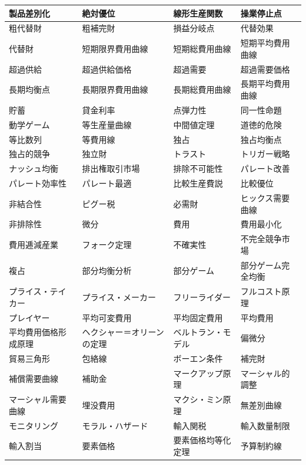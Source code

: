 \documentclass[xelatex,a4paper,base=11pt,ja=standard,jafont=noto]{bxjsreport}
\begin{document}
\begin{table}[H]
\centering
\small
\begin{tabular}{|>{\raggedright\arraybackslash}p{3.5cm}|>{\raggedright\arraybackslash}p{3.5cm}|>{\raggedright\arraybackslash}p{3.5cm}|>{\raggedright\arraybackslash}p{3.5cm}|}
\hline
製品差別化 & 絶対優位 & 線形生産関数 & 操業停止点 \\
\hline
粗代替財 & 粗補完財 & 損益分岐点 & 代替効果 \\
\hline
代替財 & 短期限界費用曲線 & 短期総費用曲線 & 短期平均費用曲線 \\
\hline
超過供給 & 超過供給価格 & 超過需要 & 超過需要価格 \\
\hline
長期均衡点 & 長期限界費用曲線 & 長期総費用曲線 & 長期平均費用曲線 \\
\hline
貯蓄 & 貸金利率 & 点弾力性 & 同一性命題 \\
\hline
動学ゲーム & 等生産量曲線 & 中間値定理 & 道徳的危険 \\
\hline
等比数列 & 等費用線 & 独占 & 独占均衡点 \\
\hline
独占的競争 & 独立財 & トラスト & トリガー戦略 \\
\hline
ナッシュ均衡 & 排出権取引市場 & 排除不可能性 & パレート改善 \\
\hline
パレート効率性 & パレート最適 & 比較生産費説 & 比較優位 \\
\hline
非結合性 & ピグー税 & 必需財 & ヒックス需要曲線 \\
\hline
非排除性 & 微分 & 費用 & 費用最小化 \\
\hline
費用逓減産業 & フォーク定理 & 不確実性 & 不完全競争市場 \\
\hline
複占 & 部分均衡分析 & 部分ゲーム & 部分ゲーム完全均衡 \\
\hline
プライス・テイカー & プライス・メーカー & フリーライダー & フルコスト原理 \\
\hline
プレイヤー & 平均可変費用 & 平均固定費用 & 平均費用 \\
\hline
平均費用価格形成原理 & ヘクシャー＝オリーンの定理 & ベルトラン・モデル & 偏微分 \\
\hline
貿易三角形 & 包絡線 & ボーエン条件 & 補完財 \\
\hline
補償需要曲線 & 補助金 & マークアップ原理 & マーシャル的調整 \\
\hline
マーシャル需要曲線 & 埋没費用 & マクシ・ミン原理 & 無差別曲線 \\
\hline
モニタリング & モラル・ハザード & 輸入関税 & 輸入数量制限 \\
\hline
輸入割当 & 要素価格 & 要素価格均等化定理 & 予算制約線 \\

\end{tabular}
\end{table}
\end{document}
